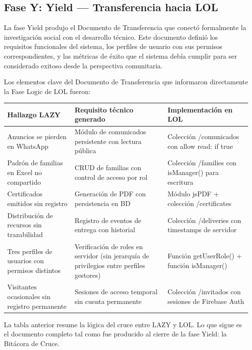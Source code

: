 \documentclass[14pt,a4paper,oneside]{extbook}
\begin{document}
\subsection{Fase Y: Yield — Transferencia hacia LOL}

La fase Yield produjo el Documento de Transferencia que conectó formalmente la investigación social con el desarrollo técnico. Este documento definió los requisitos funcionales del sistema, los perfiles de usuario con sus permisos correspondientes, y las métricas de éxito que el sistema debía cumplir para ser considerado exitoso desde la perspectiva comunitaria.

Los elementos clave del Documento de Transferencia que informaron directamente la Fase Logic de LOL fueron:



\begin{table}[htbp]
\centering
\begin{tabular}{p{} p{} p{}}
\toprule
\textbf{Hallazgo LAZY} & \textbf{Requisito técnico generado} & \textbf{Implementación en LOL} \\
\midrule
Anuncios se pierden en WhatsApp & Módulo de comunicados persistente con lectura pública & Colección /comunicados con allow read: if true \\
Padrón de familias en Excel no compartido & CRUD de familias con control de acceso por rol & Colección /families con isManager() para escritura \\
Certificados emitidos sin registro & Generación de PDF con persistencia en BD & Módulo jsPDF + colección /certificates \\
Distribución de recursos sin trazabilidad & Registro de eventos de entrega con historial & Colección /deliveries con timestamps de servidor \\
Tres perfiles de usuarios con permisos distintos & Verificación de roles en servidor (sin jerarquía de privilegios entre perfiles gestores) & Función getUserRole() + función isManager() \\
Visitantes ocasionales sin registro permanente & Sesiones de acceso temporal sin cuenta permanente & Colección /invitados con sesiones de Firebase Auth \\
\bottomrule
\end{tabular}
\end{table}

La tabla anterior resume la lógica del cruce entre LAZY y LOL. Lo que sigue es el documento completo tal como fue producido al cierre de la fase Yield: la Bitácora de Cruce.
\end{document}
